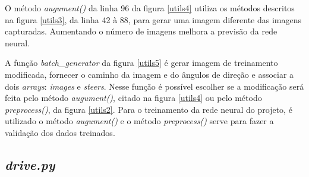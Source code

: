 \begin{figure}[H]
	\centering
\end{figure}

O método \textit{augument()} da linha 96 da figura \ref{utils4} utiliza os métodos descritos na figura \ref{utils3}, da linha 42 à 88, para gerar uma imagem diferente das imagens capturadas. Aumentando o número de imagens melhora a previsão da rede neural.

\begin{figure}[H]
	\centering
\end{figure}

A função \textit{batch\_generator} da figura \ref{utils5} é gerar imagem de treinamento modificada, fornecer o caminho da imagem e do ângulos de direção e associar a dois \textit{arrays}: \textit{images} e \textit{steers}. Nesse função é possível escolher se a modificação será feita pelo método \textit{augument()}, citado na figura \ref{utils4} ou pelo método \textit{preprocess()}, da figura \ref{utils2}. Para o treinamento da rede neural do projeto, é utilizado o método \textit{augument()} e o método \textit{preprocess()} serve para fazer a validação dos dados treinados.

\subsection{\textit{drive.py}}
\label{sec:drive.py}

